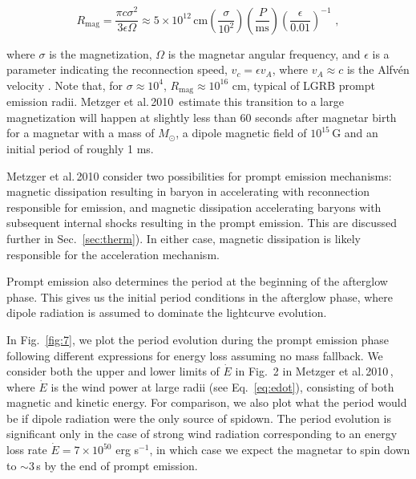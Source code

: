 \documentclass{article}
\begin{document}
\begin{equation}
  R_{\mathrm{mag}}=\frac{\pi c \sigma^2}{3 \epsilon \Omega}\approx 5 \times 10^{12}\, \mathrm{cm} \left(\frac{\sigma}{10^2}\right) \left(\frac{P}{\mathrm{ms}}\right)\left(\frac{\epsilon}{0.01}\right)^{-1}\,\,,
\end{equation}

where $\sigma$ is the magnetization, $\Omega$ is the magnetar angular frequency, and $\epsilon$ is a parameter indicating the reconnection speed, $v_c=\epsilon v_A$, where $v_A \approx c$ is the Alfv\'en velocity \cite{Metzger:2010pp}. Note that, for $\sigma\approx 10^4$, $R_{\mathrm{mag}} \approx 10^{16}$ cm, typical of LGRB prompt emission radii. Metzger et al.\,2010\,\cite{Metzger:2010pp} estimate this transition to a large magnetization will happen at slightly less than 60 seconds after magnetar birth for a magnetar with a mass of $M_{\odot}$, a dipole  magnetic field of $10^{15}$\,G and an initial period of roughly 1 ms.

Metzger et al.\,2010 \cite{Metzger:2010pp} consider two possibilities for prompt emission mechanisms: magnetic dissipation resulting in baryon in accelerating with reconnection responsible for emission, and magnetic dissipation accelerating baryons with subsequent internal shocks resulting in the prompt emission. This are discussed further in Sec.~\ref{sec:therm}). In either case, magnetic dissipation is likely responsible for the acceleration mechanism.

Prompt emission also determines the period at the beginning of the afterglow phase. This gives us the initial period conditions in the afterglow phase, where dipole radiation is assumed to dominate the lightcurve evolution. 

In Fig.~\ref{fig:7}, we plot the period evolution during the prompt emission phase following different expressions for energy loss assuming no mass fallback. We consider both the upper and lower limits of $\dot{E}$ in Fig.~2 in Metzger et al.\,2010\,\cite{Metzger:2010pp}, where $\dot{E}$ is the wind power at large radii (see Eq.~\ref{eq:edot}), consisting of both magnetic and kinetic energy. For comparison, we also plot what the period would be if dipole radiation were the only source of spidown. The period evolution is significant only in the case of strong wind radiation corresponding to an energy loss rate $\dot{E} = 7 \times 10^{50}$ erg s$^{-1}$, in which case we expect the magnetar to spin down to $\sim 3$\,s by the end of prompt emission.
\end{document}
